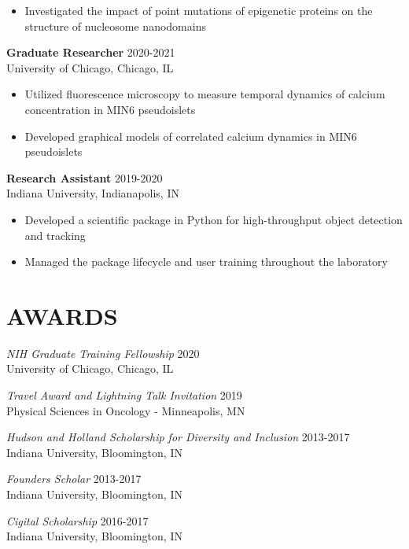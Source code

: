 \documentclass[margin, 10pt]{res} %
\begin{document}
\begin{resume}
\begin{itemize}
\item Investigated the impact of point mutations of epigenetic proteins on the structure of nucleosome nanodomains


\end{itemize}

\textbf{Graduate Researcher} \hfill 2020-2021 \\
University of Chicago, Chicago, IL

\begin{itemize} \itemsep -2pt %

\item Utilized fluorescence microscopy to measure temporal dynamics of calcium concentration in MIN6 pseudoislets

\item Developed graphical models of correlated calcium dynamics in MIN6 pseudoislets

 
\end{itemize}
 
\textbf{Research Assistant} \hfill 2019-2020\\
Indiana University, Indianapolis, IN
\begin{itemize} \itemsep -2pt

\item Developed a scientific package in Python for high-throughput object detection and tracking
\item Managed the package lifecycle and user training throughout the laboratory
\end{itemize}


\section{AWARDS}

{\sl NIH Graduate Training Fellowship} \hfill 2020 \\
University of Chicago, Chicago, IL

{\sl Travel Award and Lightning Talk Invitation} \hfill 2019 \\
Physical Sciences in Oncology - Minneapolis, MN

{\sl Hudson and Holland Scholarship for Diversity and Inclusion} \hfill 2013-2017 \\
Indiana University, Bloomington, IN 

{\sl Founders Scholar} \hfill 2013-2017 \\
Indiana University, Bloomington, IN 

{\sl Cigital Scholarship} \hfill 2016-2017 \\
Indiana University, Bloomington, IN 


\end{resume}
\end{document}
